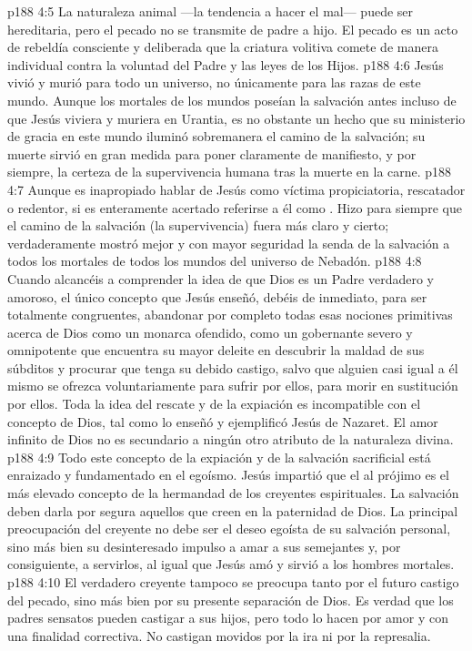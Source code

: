 \vs p188 4:5 La naturaleza animal ---la tendencia a hacer el mal--- puede ser hereditaria, pero el pecado no se transmite de padre a hijo. El pecado es un acto de rebeldía consciente y deliberada que la criatura volitiva comete de manera individual contra la voluntad del Padre y las leyes de los Hijos.
\vs p188 4:6 Jesús vivió y murió para todo un universo, no únicamente para las razas de este mundo. Aunque los mortales de los mundos poseían la salvación antes incluso de que Jesús viviera y muriera en Urantia, es no obstante un hecho que su ministerio de gracia en este mundo iluminó sobremanera el camino de la salvación; su muerte sirvió en gran medida para poner claramente de manifiesto, y por siempre, la certeza de la supervivencia humana tras la muerte en la carne.
\vs p188 4:7 Aunque es inapropiado hablar de Jesús como víctima propiciatoria, rescatador o redentor, si es enteramente acertado referirse a él como . Hizo para siempre que el camino de la salvación (la supervivencia) fuera más claro y cierto; verdaderamente mostró mejor y con mayor seguridad la senda de la salvación a todos los mortales de todos los mundos del universo de Nebadón.
\vs p188 4:8 Cuando alcancéis a comprender la idea de que Dios es un Padre verdadero y amoroso, el único concepto que Jesús enseñó, debéis de inmediato, para ser totalmente congruentes, abandonar por completo todas esas nociones primitivas acerca de Dios como un monarca ofendido, como un gobernante severo y omnipotente que encuentra su mayor deleite en descubrir la maldad de sus súbditos y procurar que tenga su debido castigo, salvo que alguien casi igual a él mismo se ofrezca voluntariamente para sufrir por ellos, para morir en sustitución por ellos. Toda la idea del rescate y de la expiación es incompatible con el concepto de Dios, tal como lo enseñó y ejemplificó Jesús de Nazaret. El amor infinito de Dios no es secundario a ningún otro atributo de la naturaleza divina.
\vs p188 4:9 Todo este concepto de la expiación y de la salvación sacrificial está enraizado y fundamentado en el egoísmo. Jesús impartió que el  al prójimo es el más elevado concepto de la hermandad de los creyentes espirituales. La salvación deben darla por segura aquellos que creen en la paternidad de Dios. La principal preocupación del creyente no debe ser el deseo egoísta de su salvación personal, sino más bien su desinteresado impulso a amar a sus semejantes y, por consiguiente, a servirlos, al igual que Jesús amó y sirvió a los hombres mortales.
\vs p188 4:10 El verdadero creyente tampoco se preocupa tanto por el futuro castigo del pecado, sino más bien por su presente separación de Dios. Es verdad que los padres sensatos pueden castigar a sus hijos, pero todo lo hacen por amor y con una finalidad correctiva. No castigan movidos por la ira ni por la represalia.
